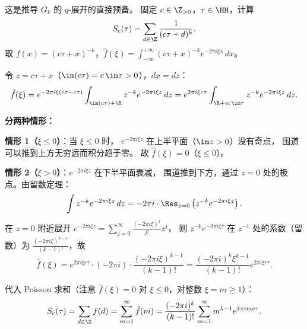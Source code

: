 \begin{example}
\label{ex:poisson-for-eisenstein}
这是推导 $G_k$ 的 $q$-展开的直接预备。
固定 $c \in \Z_{>0}$，$\tau \in \HH$，计算
\[
  S_c(\tau) = \sum_{d \in \Z} \frac{1}{(c\tau + d)^k}.
\]
取 $f(x) = (c\tau + x)^{-k}$，$\hat{f}(\xi) = \int_{-\infty}^{+\infty} (c\tau + x)^{-k} e^{-2\pi i \xi x}\, dx$。

令 $z = c\tau + x$（$\im(c\tau) = c\, \im\tau > 0$），$dx = dz$：
\[
  \hat{f}(\xi)
  = e^{-2\pi i \xi(c\tau - c\tau)} \int_{\im(c\tau) + \R} z^{-k} e^{-2\pi i\xi z}\, dz
  = e^{2\pi i \xi c\tau} \int_{\R + i c\, \im\tau} z^{-k} e^{-2\pi i \xi z}\, dz.
\]

\textbf{分两种情形：}

\textbf{情形 1（$\xi \leq 0$）}：当 $\xi \leq 0$ 时，
$e^{-2\pi i\xi z}$ 在上半平面（$\im z > 0$）没有奇点，
围道可以推到上方无穷远而积分趋于零。
故 $\hat{f}(\xi) = 0$（$\xi \leq 0$）。

\textbf{情形 2（$\xi > 0$）}：$e^{-2\pi i\xi z}$ 在下半平面衰减，
围道推到下方，通过 $z = 0$ 处的极点。由留数定理：
\[
  \int z^{-k} e^{-2\pi i\xi z}\, dz = -2\pi i \cdot \Res_{z=0}\left(z^{-k} e^{-2\pi i\xi z}\right).
\]
在 $z = 0$ 附近展开 $e^{-2\pi i\xi z} = \sum_{j=0}^\infty \frac{(-2\pi i\xi)^j}{j!} z^j$，
则 $z^{-k} e^{-2\pi i\xi z}$ 在 $z^{-1}$ 处的系数（留数）为
$\frac{(-2\pi i\xi)^{k-1}}{(k-1)!}$，故
\[
  \hat{f}(\xi) = e^{2\pi i\xi c\tau} \cdot (-2\pi i) \cdot \frac{(-2\pi i\xi)^{k-1}}{(k-1)!}
  = \frac{(-2\pi i)^k \xi^{k-1}}{(k-1)!} e^{2\pi i\xi c\tau}.
\]

代入 Poisson 求和（注意 $\hat{f}(\xi) = 0$ 对 $\xi \leq 0$，对整数 $\xi = m \geq 1$）：
\[
  S_c(\tau) = \sum_{d \in \Z} f(d) = \sum_{m=1}^{\infty} \hat{f}(m)
  = \frac{(-2\pi i)^k}{(k-1)!} \sum_{m=1}^{\infty} m^{k-1} e^{2\pi i m c\tau}.
\]
\end{example}
